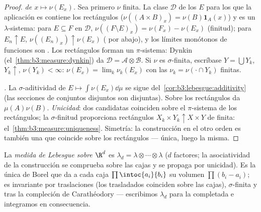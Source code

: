 \begin{proof}
\emph{ de
$x \mapsto \nu(E_x)$.} Sea primero $\nu$ finita. La clase $\mathcal D$
de los $E$ para los que la aplicación es
 contiene los rectángulos
($\nu((A\times B)_x) =
\nu(B)\mathbf 1_A(x)$) y es un $\lambda$-sistema: para $E
\subseteq F$ en $\mathcal D$, $\nu((F\setminus E)_x) =
\nu(F_x) - \nu(E_x)$ (finitud); para $E_n \uparrow E$,
$\nu((E_n)_x) \uparrow \nu(E_x)$
( por abajo), y los
límites monótonos de funciones
 son . Los
rectángulos forman un $\pi$-sistema: Dynkin
(el~\cref{thm:b3:measure:dynkin}) da $\mathcal D = \mathcal
A\otimes\mathcal B$. Si $\nu$ es $\sigma$-finita, escríbase $Y =
\bigcup Y_k$, $Y_k \uparrow$, $\nu(Y_k) < \infty$: $\nu(E_x) =
\lim_k\nu_k(E_x)$ con las $\nu_k = \nu(\cdot\cap Y_k)$ finitas.

\emph{.} La $\sigma$-aditividad
de $E \mapsto
\int\nu(E_x)\dd\mu$ se sigue del~\cref{cor:b3:lebesgue:additivity} (las
secciones de conjuntos disjuntos son disjuntas). Sobre los rectángulos
da $\mu(A)\nu(B)$. \emph{Unicidad}: dos candidatas coinciden sobre el
$\pi$-sistema de los rectángulos; la $\sigma$-finitud proporciona
rectángulos $X_k\times
Y_k \uparrow X\times Y$ de 
finita: el~\cref{thm:b3:measure:uniqueness}. Simetría: la construcción
en el otro orden es también una 
que coincide sobre los rectángulos --- única, luego la misma.
\end{proof}

\begin{definition}\label{def:b3:product:lebesgue}
La \emph{medida de Lebesgue sobre $\R^d$} es $\lambda_d = \lambda\otimes\cdots\otimes\lambda$ ($d$
factores; la asociatividad de la construcción se comprueba sobre las
cajas y se propaga por unicidad). Es la única
 de Borel que da a cada caja
$\prod\intoc{a_i}{b_i}$ su volumen $\prod(b_i - a_i)$; es invariante por
traslaciones (los trasladados coinciden sobre las cajas),
$\sigma$-finita y  tras la
compleción de Carathéodory ---
escribimos $\lambda_d$ para la 
completada e integramos en consecuencia.
\end{definition}

